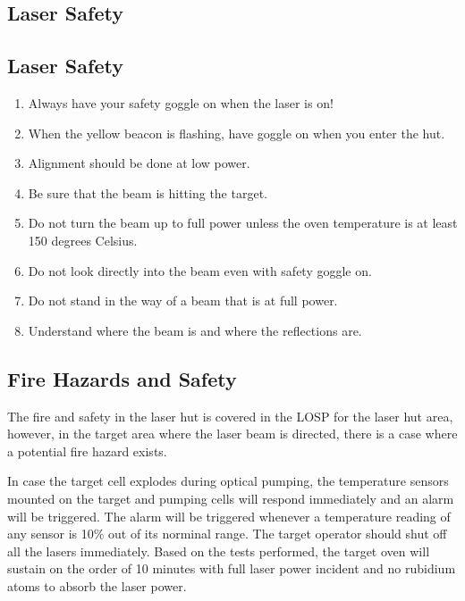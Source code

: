 \begin{safetyen}{10}{5}
\section{Laser Safety}
\label{sec:lsafe}

\subsection{Laser Safety}
\label{sec:lassaf}

\begin{enumerate}
\item Always have your safety goggle on when the laser is on!
\item When the yellow beacon is flashing, have goggle on when you enter
the hut.
\item Alignment should be done at low power.
\item Be sure that the beam is hitting the target.
\item Do not turn the beam up to full power unless the oven temperature
is at least 150 degrees Celsius.
\item Do not look directly into the beam even with safety goggle on.
\item Do not stand in the way of a beam that is at full power.
\item Understand where the beam is and where the reflections are.
\end{enumerate}

\subsection{Fire Hazards and Safety}
\label{sec:fire}

The fire and safety in the laser hut is covered in the LOSP
for the laser hut area,
however, in the target area where the laser beam is directed, there is a
case where a potential 
fire hazard exists. 

In case the target cell explodes during optical pumping, the temperature 
sensors mounted on the target and pumping cells will respond immediately and 
an alarm will be triggered. The alarm will be triggered whenever 
a temperature reading of any sensor is 10$\%$ out of its norminal range.
The target operator should shut off all the lasers immediately.
Based on the tests performed, the target oven will sustain on the order of 10 
minutes with full laser power incident and no rubidium atoms 
to absorb the laser power.



\end{safetyen}
